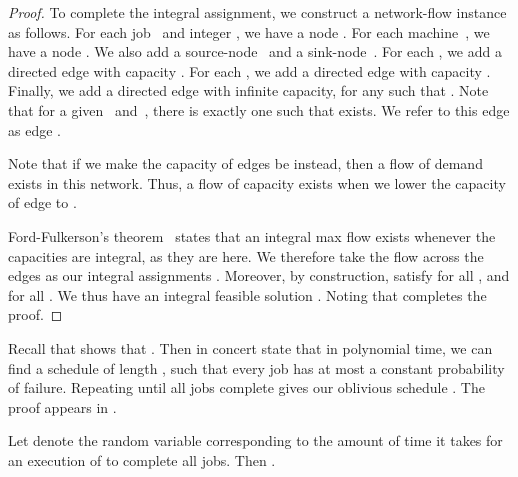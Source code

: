 \begin{proof}
  To complete the integral assignment, we construct a network-flow
  instance as follows.  For each job~ and integer , we have a
  node .  For each machine~, we have a node .  We also
  add a source-node~ and a sink-node~.  For each , we
  add a directed edge  with capacity .
  For each , we add a directed edge  with capacity
  .  Finally, we add a directed edge  with
  infinite capacity, for any  such that .  Note that for a given~ and~, there is
  exactly one  such that  exists.  We refer to this
  edge as edge .
   
   Note that if we make the capacity of edges  be
   instead, then a flow of
  demand  exists in this network.
  Thus, a flow of capacity  exists 
  when we lower the capacity of edge  to .
  
  Ford-Fulkerson's theorem~\cite{FordFu62,CormenLeRi01} states that an
  integral max flow exists whenever the capacities are integral, as
  they are here.  We therefore take the flow across the edges 
  as our integral assignments .  Moreover, by
  construction,  satisfy  for all , and  for all .  We thus have an integral feasible
  solution .  Noting that  completes the proof.
\end{proof}

Recall that  shows that .  Then  in concert state
that in polynomial time, we can find a schedule  of length
, such that every job has at most a constant
probability of failure. Repeating  until all jobs complete
gives our oblivious schedule \ALGobl.  The proof appears in .
\newcommand{\indboundthm}{
\begin{theorem}\thmlabel{indbound}
  Let  denote the random variable corresponding to the
  amount of time it takes for an execution of \ALGobl to complete all
  jobs.  Then .
\end{theorem}
}
\indboundthm
\newcommand{\indboundproof}{
\begin{proof}
  From \lemreftwo{lplower}{lp1rounding}, we have a schedule 
  of length  that gives each job a constant
  probability of success.  Applying a Chernoff bound gives us that a
  particular job completes in  repetitions of ,
  with probability at least , where the constant
  exponent appears as a constant factor in the number of repetitions.
  Taking a union bound over all jobs gives that with probability at
  least , \emph{all} jobs complete in 
  repetitions.  Since this probability drops off dramatically as the
  number of repetitions increases, we have .
\end{proof}
}\vspace{-.5em}

